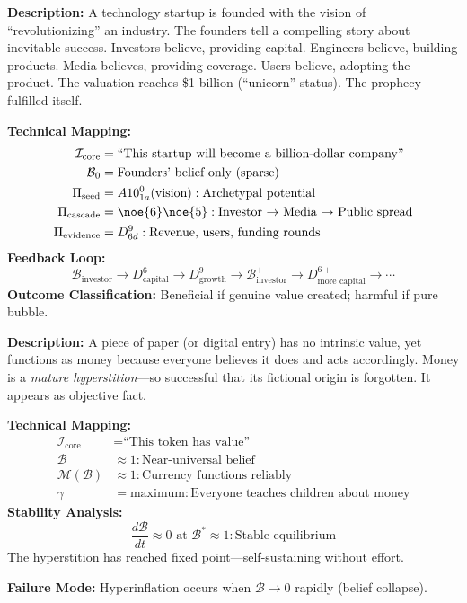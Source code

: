 \begin{tcolorbox}[colback=yellow!5!white,colframe=yellow!65!black,title=\textbf{Scenario 1: Startup Mythology (Unicorn Creation)},breakable]

\textbf{Description:}
A technology startup is founded with the vision of ``revolutionizing'' an industry. The founders tell a compelling story about inevitable success. Investors believe, providing capital. Engineers believe, building products. Media believes, providing coverage. Users believe, adopting the product. The valuation reaches \$1 billion (``unicorn'' status). The prophecy fulfilled itself.

\textbf{Technical Mapping:}
\begin{align*}
\mathcal{I}_{\text{core}} &= \text{``This startup will become a billion-dollar company''} \\
\mathcal{B}_0 &= \text{Founders' belief only (sparse)} \\
\Pi_{\text{seed}} &= A10^0_{1a}(\text{vision}) : \text{Archetypal potential} \\
\Pi_{\text{cascade}} &= \noe{6}\noe{5} : \text{Investor $\to$ Media $\to$ Public spread} \\
\Pi_{\text{evidence}} &= D^9_{6d} : \text{Revenue, users, funding rounds}
\end{align*}
\textbf{Feedback Loop:}
\[
\mathcal{B}_{\text{investor}} \to D^6_{\text{capital}} \to D^9_{\text{growth}} \to \mathcal{B}_{\text{investor}}^+ \to D^{6+}_{\text{more capital}} \to \cdots
\]
\textbf{Outcome Classification:} Beneficial if genuine value created; harmful if pure bubble.

\end{tcolorbox}

\begin{tcolorbox}[colback=yellow!5!white,colframe=yellow!65!black,title=\textbf{Scenario 2: Currency/Money (Mature Hyperstition)},breakable]

\textbf{Description:}
A piece of paper (or digital entry) has no intrinsic value, yet functions as money because everyone believes it does and acts accordingly. Money is a \emph{mature hyperstition}---so successful that its fictional origin is forgotten. It appears as objective fact.

\textbf{Technical Mapping:}
\begin{align*}
\mathcal{I}_{\text{core}} &= \text{``This token has value''} \\
\mathcal{B} &\approx 1 : \text{Near-universal belief} \\
\mathcal{M}(\mathcal{B}) &\approx 1 : \text{Currency functions reliably} \\
\gamma &= \text{maximum} : \text{Everyone teaches children about money}
\end{align*}
\textbf{Stability Analysis:}
\[
\frac{d\mathcal{B}}{dt} \approx 0 \text{ at } \mathcal{B}^* \approx 1 : \text{Stable equilibrium}
\]
The hyperstition has reached fixed point---self-sustaining without effort.

\textbf{Failure Mode:} Hyperinflation occurs when $\mathcal{B} \to 0$ rapidly (belief collapse).

\end{tcolorbox}

